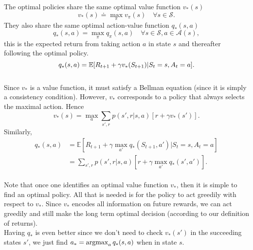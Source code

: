 The optimal policies share the same optimal value function $v_*(s)$
\begin{equation}
    v_*(s) \doteq \max_\pi v_\pi(s) \quad \forall s \in \mathcal{S}.
\end{equation}
They also share the same optimal action-value function $q_*(s, a)$
\begin{equation}
    q_*(s, a) = \max_\pi q_\pi (s, a) \quad \forall s \in \mathcal{S}, a \in \mathcal{A}(s),
\end{equation}
this is the expected return from taking action $a$ in state $s$ and thereafter following the optimal policy.
\begin{equation}
    q_*(s, a) = \mathbb{E}{} [R_{t+1} + \gamma v_*(S_{t+1}) | S_{t} = s, A_t = a].
\end{equation}\\

Since $v_*$ is a value function, it must satisfy a Bellman equation (since it is simply a consistency condition). However, $v_*$ corresponds to a policy that always selects the maximal action. Hence 
\begin{equation}
    v_*(s) = \max_a \sum_{s', r} p(s', r|s, a) [r + \gamma v_*(s')].
\end{equation}
Similarly,
\begin{align}
    q_*(s, a) &= \mathbb{E} [R_{t+1} + \gamma \max_{a'}q_*(S_{t+1}, a') | S_t=s, A_t = a]\\
              &= \sum_{s', r} p(s', r| s, a ) [r + \gamma \max_{a'}q_*(s', a')].
\end{align} \\

Note that once one identifies an optimal value function $v_*$, then it is simple to find an optimal policy. All that is needed is for the policy to act greedily with respect to $v_*$. Since $v_*$ encodes all information on future rewards, we can act greedily and still make the long term optimal decision (according to our definition of returns).\\

Having $q_*$ is even better since we don't need to check $v_*(s')$ in the succeeding states $s'$, we just find $a_* = \operatorname*{argmax}_a q_*(s, a)$ when in state $s$.
